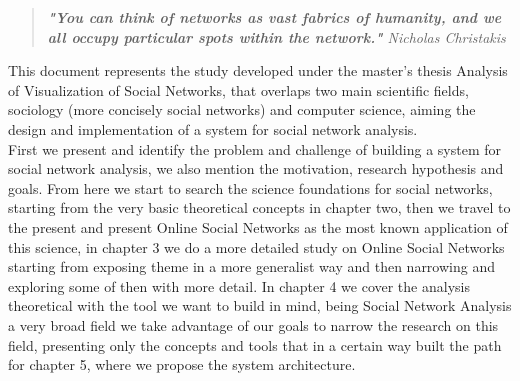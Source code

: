 
\begin{quote}
\textit{\textbf{"You can think of networks as vast fabrics of humanity, and we all occupy particular spots within the network."} Nicholas Christakis}
\end{quote}

This document represents the study developed under the master's thesis Analysis of Visualization of Social Networks, that overlaps
two main scientific fields, sociology (more concisely social networks) and computer science, aiming the design and implementation of a system for social
network analysis.\\

\indent First we present and identify the problem and challenge of building a system for social network analysis, we also mention the motivation,
research hypothesis and goals. From here we start to search the science foundations for social networks, starting from the very basic theoretical concepts in chapter two, then we travel to the present and present Online Social Networks as the most known application of this science, in chapter 3 we do a more detailed study on Online Social Networks starting from exposing theme in a more generalist way and then narrowing and exploring some of then with more detail. In chapter 4 we cover the analysis theoretical with the tool we want to build in mind, being Social Network Analysis a very broad field we take advantage of our goals to narrow the research on this field, presenting only the concepts and tools that in a certain way built the path for chapter 5, where we propose the system architecture.\\

